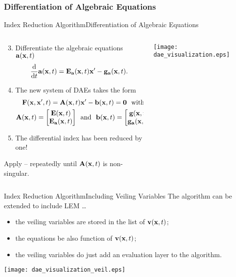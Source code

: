 \subsubsection{Differentiation of Algebraic Equations}

\begin{frame}{Index Reduction Algorithm}{Differentiation of Algebraic Equations}
  \vspace{-1.0em}
  \begin{columns}
    \begin{column}[c]{0.6\textwidth}
      \begin{enumerate}[<+->]\setcounter{enumi}{2}
        \item Differentiate the algebraic equations $\mathbf{a}(\mathbf{x}, t)$
        \begin{equation*}
          \dfrac{\text{d}}{\text{d}t} \mathbf{a}(\mathbf{x}, t) = \mathbf{E}_{\mathbf{a}}(\mathbf{x}, t) \mathbf{x}^\prime - \mathbf{g}_{\mathbf{a}}(\mathbf{x}, t) \text{.}
        \end{equation*}
        \item The new system of \acp{DAE} takes the form
        \begin{align*}
          \mathbf{F}(\mathbf{x}, \mathbf{x}^\prime, t) = \mathbf{A}(\mathbf{x}, t) &\mathbf{x}^\prime - \mathbf{b}(\mathbf{x}, t) = \mathbf{0} ~~ \text{with} \\
          \mathbf{A}(\mathbf{x}, t) = \begin{bmatrix} \mathbf{E}(\mathbf{x}, t) \\ \mathbf{E}_{\mathbf{a}}(\mathbf{x}, t) \end{bmatrix}
          ~~ &\text{and} ~~
          \mathbf{b}(\mathbf{x}, t) = \begin{bmatrix} \mathbf{g}(\mathbf{x}, t) \\ \mathbf{g}_{\mathbf{a}}(\mathbf{x}, t) \end{bmatrix} \text{.}
        \end{align*}
        \item The differential index has been reduced by one!
      \end{enumerate}
      \begin{bbox}
        Apply -- repeatedly until $\mathbf{A}(\mathbf{x}, t)$ is non-singular.
      \end{bbox}
    \end{column}
    \begin{column}[c]{0.4\textwidth}
      \texttt{[image: dae\_visualization.eps]}
    \end{column}
  \end{columns}
\end{frame}

\begin{frame}{Index Reduction Algorithm}{Including Veiling Variables}
  \vspace{-1.0em}
  The algorithm can be extended to include \ac{LEM} \dots
  \begin{itemize}
    \item the veiling variables are stored in the list of $\mathbf{v}(\mathbf{x}, t)$;
    \item the equations be also function of $\mathbf{v}(\mathbf{x}, t)$;
    \item the veiling variables do just add an evaluation layer to the algorithm.
  \end{itemize}
  \hspace{-0.025\textwidth}\texttt{[image: dae\_visualization\_veil.eps]}
\end{frame}


